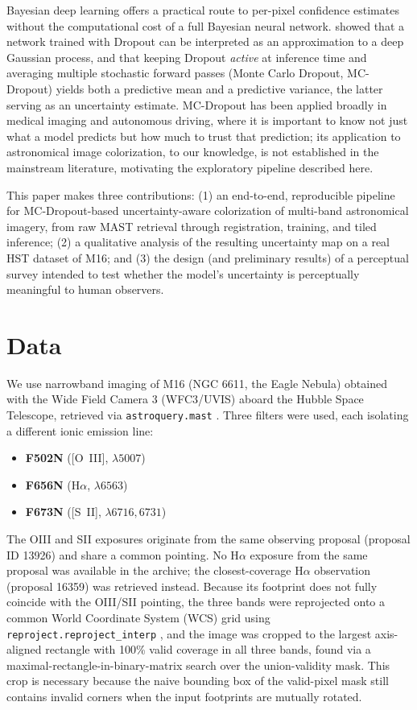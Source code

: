 \documentclass[12pt]{article}
\begin{document}
Bayesian deep learning offers a practical route to per-pixel confidence
estimates without the computational cost of a full Bayesian neural network.
\citet{gal2016dropout} showed that a network trained with Dropout can be
interpreted as an approximation to a deep Gaussian process, and that keeping
Dropout \emph{active} at inference time and averaging multiple stochastic
forward passes (Monte Carlo Dropout, MC-Dropout) yields both a predictive
mean and a predictive variance, the latter serving as an uncertainty
estimate. MC-Dropout has been applied broadly in medical imaging and
autonomous driving, where it is important to know not just what a model
predicts but how much to trust that prediction; its application to
astronomical image colorization, to our knowledge, is not established in
the mainstream literature, motivating the exploratory pipeline described
here.

This paper makes three contributions: (1) an end-to-end, reproducible
pipeline for MC-Dropout-based uncertainty-aware colorization of multi-band
astronomical imagery, from raw MAST retrieval through registration,
training, and tiled inference; (2) a qualitative analysis of the resulting
uncertainty map on a real HST dataset of M16; and (3) the design (and
preliminary results) of a perceptual survey intended to test whether the
model's uncertainty is perceptually meaningful to human observers.

\section{Data}

We use narrowband imaging of M16 (NGC 6611, the Eagle Nebula) obtained with
the Wide Field Camera 3 (WFC3/UVIS) aboard the Hubble Space Telescope,
retrieved via \texttt{astroquery.mast} \citep{astroquery, astropy2018}. Three
filters were used, each isolating a different ionic emission line:

\begin{itemize}
\item \textbf{F502N} (\textrm{[O~III]}, $\lambda5007$)
\item \textbf{F656N} (H$\alpha$, $\lambda6563$)
\item \textbf{F673N} (\textrm{[S~II]}, $\lambda6716,6731$)
\end{itemize}

The OIII and SII exposures originate from the same observing proposal
(proposal ID 13926) and share a common pointing. No H$\alpha$ exposure from
the same proposal was available in the archive; the closest-coverage
H$\alpha$ observation (proposal 16359) was retrieved instead. Because its
footprint does not fully coincide with the OIII/SII pointing, the three
bands were reprojected onto a common World Coordinate System (WCS) grid
using \texttt{reproject.reproject\_interp} \citep{reproject}, and the image
was cropped to the largest axis-aligned rectangle with 100\% valid coverage
in all three bands, found via a maximal-rectangle-in-binary-matrix search
over the union-validity mask. This crop is necessary because the naive
bounding box of the valid-pixel mask still contains invalid corners when the
input footprints are mutually rotated.
\end{document}
